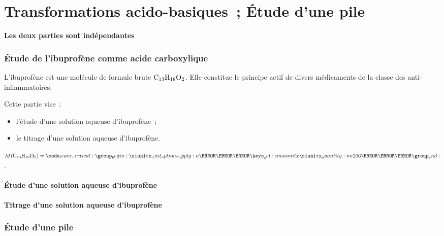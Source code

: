 \part{Transformations acido-basiques~; Étude d'une pile}
\begin{center}
    \textbf{Les deux parties sont indépendantes}
\end{center}
\section{Étude de l'ibuprofène comme acide carboxylique}
L'ibuprofène est une molécule de formule brute $\ce{C13H18O2}$. Elle constitue
le principe actif de divers médicaments de la classe des anti-inflammatoires.

Cette partie vise~:
\begin{itemize}
    \item l'étude d'une solution aqueuse d'ibuprofène~;
    \item le titrage d'une solution aqueuse d'ibuprofène.
\end{itemize}
\begin{donnees}
    $M(\ce{C13H18O2})=\qty{206}{\g\per\mol}$.
\end{donnees}

\subsection{Étude d'une solution aqueuse d'ibuprofène}


\subsection{Titrage d'une solution aqueuse d'ibuprofène}


\section{Étude d'une pile}

